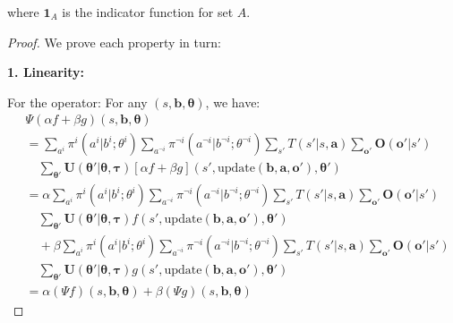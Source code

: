 \begin{lemma}
\begin{enumerate}
              where $\mathbf{1}_{A}$ is the indicator function for set $A$.
    \end{enumerate}
\end{lemma}

\begin{proof}
    We prove each property in turn:

    \textbf{1. Linearity:}

    For the operator: For any $(s, \boldsymbol{b}, \boldsymbol{\theta})$, we have:
    \begin{align}
         & \Psi(\alpha f + \beta g)(s, \boldsymbol{b}, \boldsymbol{\theta})                                                                                                                                                            \\
         & = \sum_{a^i}\pi^{i}(a^{i}|b^{i}; \theta^{i}) \sum_{a^{\neg i}}\pi^{\neg i}(a^{\neg i}|b^{\neg i}; \theta^{\neg i}) \sum_{s'}T(s'|s, \boldsymbol{a}) \sum_{\boldsymbol{o}'}\boldsymbol{O}(\boldsymbol{o}'|s')                \\
         & \quad \sum_{\boldsymbol{\theta}'}\boldsymbol{U}(\boldsymbol{\theta}'|\boldsymbol{\theta}, \boldsymbol{\tau}) [\alpha f + \beta g](s', \text{update}(\boldsymbol{b}, \boldsymbol{a}, \boldsymbol{o}'), \boldsymbol{\theta}') \\
         & = \alpha \sum_{a^i}\pi^{i}(a^{i}|b^{i}; \theta^{i}) \sum_{a^{\neg i}}\pi^{\neg i}(a^{\neg i}|b^{\neg i}; \theta^{\neg i}) \sum_{s'}T(s'|s, \boldsymbol{a}) \sum_{\boldsymbol{o}'}\boldsymbol{O}(\boldsymbol{o}'|s')         \\
         & \quad \sum_{\boldsymbol{\theta}'}\boldsymbol{U}(\boldsymbol{\theta}'|\boldsymbol{\theta}, \boldsymbol{\tau}) f(s', \text{update}(\boldsymbol{b}, \boldsymbol{a}, \boldsymbol{o}'), \boldsymbol{\theta}')                    \\
         & \quad + \beta \sum_{a^i}\pi^{i}(a^{i}|b^{i}; \theta^{i}) \sum_{a^{\neg i}}\pi^{\neg i}(a^{\neg i}|b^{\neg i}; \theta^{\neg i}) \sum_{s'}T(s'|s, \boldsymbol{a}) \sum_{\boldsymbol{o}'}\boldsymbol{O}(\boldsymbol{o}'|s')    \\
         & \quad \sum_{\boldsymbol{\theta}'}\boldsymbol{U}(\boldsymbol{\theta}'|\boldsymbol{\theta}, \boldsymbol{\tau}) g(s', \text{update}(\boldsymbol{b}, \boldsymbol{a}, \boldsymbol{o}'), \boldsymbol{\theta}')                    \\
         & = \alpha (\Psi f)(s, \boldsymbol{b}, \boldsymbol{\theta}) + \beta (\Psi g)(s, \boldsymbol{b}, \boldsymbol{\theta})
    \end{align}


\end{proof}

